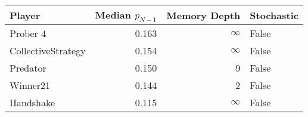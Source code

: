 \begin{tabular}{lrrl}
\toprule
             Player &  Median $p_{N-1}$ &  Memory Depth & Stochastic \\
\midrule
           Prober 4 &             0.163 &            \(\infty\) &      False \\
 CollectiveStrategy &             0.154 &            \(\infty\) &      False \\
           Predator &             0.150 &             9 &      False \\
           Winner21 &             0.144 &             2 &      False \\
          Handshake &             0.115 &            \(\infty\) &      False \\
\bottomrule
\end{tabular}
